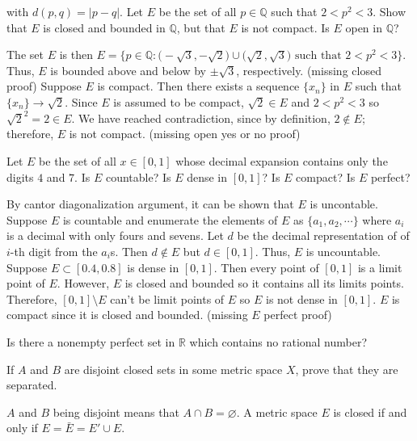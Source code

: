 \begin{exercise}
  with \(d(p, q) = \lvert p - q\rvert\).
  Let \(E\) be the set of all \(p\in\mathbb{Q}\) such that \(2 < p^2 < 3\).
  Show that \(E\) is closed and bounded in \(\mathbb{Q}\), but that \(E\) is
  not compact.
  Is \(E\) open in \(\mathbb{Q}\)?
  \par\smallskip
  The set \(E\) is then
  \(E = \bigl\{p\in\mathbb{Q}\colon\bigl(-\sqrt{3},-\sqrt{2}\bigr)\cup
  \bigl(\sqrt{2},\sqrt{3}\bigr)\text{ such that } 2 < p^2 < 3\bigr\}\).
  Thus, \(E\) is bounded above and below by \(\pm\sqrt{3}\), respectively.
  (missing closed proof)
  Suppose \(E\) is compact.
  Then there exists a sequence \(\{x_n\}\) in \(E\) such that
  \(\{x_n\}\to\sqrt{2}\).
  Since \(E\) is assumed to be compact, \(\sqrt{2}\in E\) and \(2 < p^2 < 3\)
  so \(\sqrt{2}^2 = 2\in E\).
  We have reached contradiction, since by definition, \(2\not\in E\);
  therefore, \(E\) is not compact.
  (missing open yes or no proof)
\item
  Let \(E\) be the set of all \(x\in[0,1]\) whose decimal expansion contains
  only the digits \(4\) and \(7\).
  Is \(E\) countable?
  Is \(E\) dense in \([0, 1]\)?
  Is \(E\) compact?
  Is \(E\) perfect?
  \par\smallskip
  By cantor diagonalization argument, it can be shown that \(E\) is uncontable.
  Suppose \(E\) is countable and enumerate the elements of \(E\) as
  \(\{a_1,a_2,\cdots\}\) where \(a_i\) is a decimal with only fours and sevens.
  Let \(d\) be the decimal representation of of \(i\)-th digit from the
  \(a_i\)s.
  Then \(d\not\in E\) but \(d\in[0,1]\).
  Thus, \(E\) is uncountable.
  Suppose \(E\subset [0.4,0.8]\) is dense in \([0,1]\).
  Then every point of \([0,1]\) is a limit point of \(E\).
  However, \(E\) is closed and bounded so it contains all its limits points.
  Therefore, \([0,1]\setminus E\) can't be limit points of \(E\) so \(E\)
  is not dense in \([0,1]\).
  \(E\) is compact since it is closed and bounded.
  (missing \(E\) perfect proof)
\item
  Is there a nonempty perfect set in \(\mathbb{R}\) which contains no rational
  number?
\item
  \begin{exercise}[label = (\alph*), ref = \arabic{exercisei} (\alph*)]
  \item
    If \(A\) and \(B\) are disjoint closed sets in some metric space \(X\),
    prove that they are separated.
    \par\smallskip
    \(A\) and \(B\) being disjoint means that \(A\cap B = \varnothing\).
    A metric space \(E\) is closed if and only if \(E = \bar{E} = E'\cup E\).

\end{exercise}
\end{exercise}
